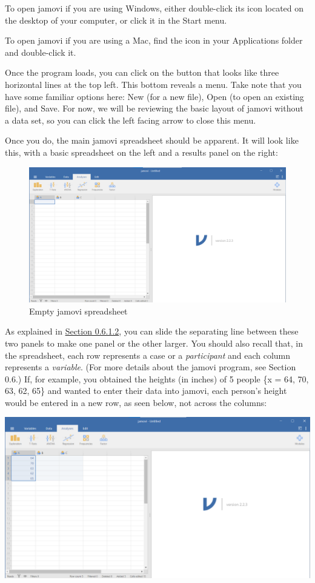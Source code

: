 \documentclass[
]{book}
\begin{document}
To open jamovi if you are using Windows, either double-click its icon located on the desktop of your computer, or click it in the Start menu.

To open jamovi if you are using a Mac, find the icon in your Applications folder and double-click it.

Once the program loads, you can click on the button that looks like three horizontal lines at the top left. This bottom reveals a menu. Take note that you have some familiar options here: {New} (for a new file), {Open} (to open an existing file), and {Save}. For now, we will be reviewing the basic layout of jamovi without a data set, so you can click the left facing arrow to close this menu.

Once you do, the main jamovi spreadsheet should be apparent. It will look like this, with a basic spreadsheet on the left and a results panel on the right:

\begin{figure}
\centering
\includegraphics{img/1.5.1.1.png}
\caption{\label{fig:unnamed-chunk-56}Empty jamovi spreadsheet}
\end{figure}

As explained in \href{https://www.erinmazerolle.com/statisticsLab/software.html\#getting-started-with-jamovi}{Section 0.6.1.2}, you can slide the separating line between these two panels to make one panel or the other larger. You should also recall that, in the spreadsheet, each row represents a case or a \emph{participant} and each column represents a \emph{variable}. (For more details about the jamovi program, see Section 0.6.) If, for example, you obtained the heights (in inches) of 5 people \{x = 64, 70, 63, 62, 65\} and wanted to enter their data into jamovi, each person's height would be entered in a new row, as seen below, not across the columns:

\includegraphics{img/1.5.1.2.png}
\end{document}
